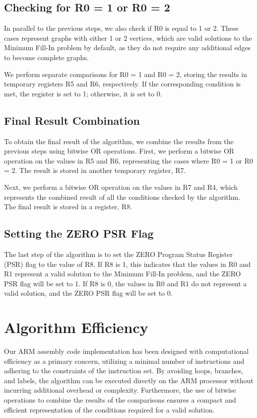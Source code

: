 \subsection{Checking for R0 = 1 or R0 = 2}

In parallel to the previous steps, we also check if R0 is equal to 1 or 2. These cases represent graphs with either 1 or 2 vertices, which are valid solutions to the Minimum Fill-In problem by default, as they do not require any additional edges to become complete graphs.

We perform separate comparisons for R0 = 1 and R0 = 2, storing the results in temporary registers R5 and R6, respectively. If the corresponding condition is met, the register is set to 1; otherwise, it is set to 0.

\subsection{Final Result Combination}

To obtain the final result of the algorithm, we combine the results from the previous steps using bitwise OR operations. First, we perform a bitwise OR operation on the values in R5 and R6, representing the cases where R0 = 1 or R0 = 2. The result is stored in another temporary register, R7.

Next, we perform a bitwise OR operation on the values in R7 and R4, which represents the combined result of all the conditions checked by the algorithm. The final result is stored in a register, R8.

\subsection{Setting the ZERO PSR Flag}

The last step of the algorithm is to set the ZERO Program Status Register (PSR) flag to the value of R8. If R8 is 1, this indicates that the values in R0 and R1 represent a valid solution to the Minimum Fill-In problem, and the ZERO PSR flag will be set to 1. If R8 is 0, the values in R0 and R1 do not represent a valid solution, and the ZERO PSR flag will be set to 0.

\section{Algorithm Efficiency}

Our ARM assembly code implementation has been designed with computational efficiency as a primary concern, utilizing a minimal number of instructions and adhering to the constraints of the instruction set. By avoiding loops, branches, and labels, the algorithm can be executed directly on the ARM processor without incurring additional overhead or complexity. Furthermore, the use of bitwise operations to combine the results of the comparisons ensures a compact and efficient representation of the conditions required for a valid solution.

